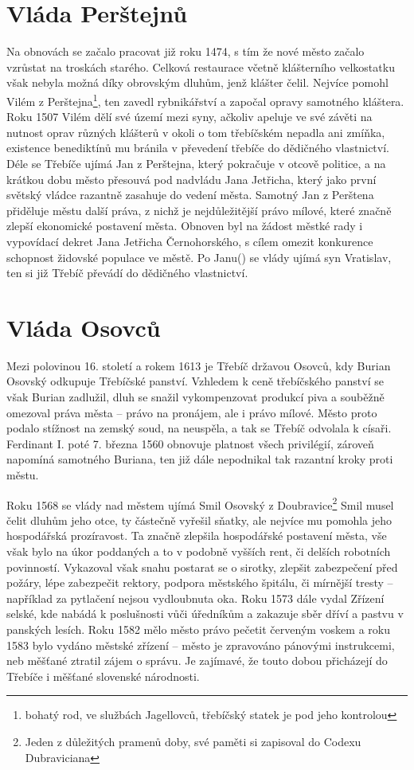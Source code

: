 \documentclass[a4paper,oneside,12p]{report}
\begin{document}
\section{Vláda Perštejnů}

Na obnovách se začalo pracovat již roku 1474, s tím že nové město začalo vzrůstat na troskách starého.
Celková restaurace včetně klášterního velkostatku však nebyla možná díky obrovským dluhům, jenž klášter čelil.
Nejvíce pomohl Vilém z Perštejna\footnote{bohatý rod, ve službách Jagellovců, třebíčský statek je pod jeho kontrolou}, ten zavedl rybnikářství a započal opravy samotného kláštera.
Roku 1507 Vilém dělí své území mezi syny, ačkoliv apeluje ve své závěti na nutnost oprav různých klášterů v okoli o tom třebíčském nepadla ani zmíňka, existence benediktínů mu bránila v převedení třebíče do dědičného vlastnictví.
Déle se Třebíče ujímá Jan z Perštejna, který pokračuje v otcově politice, a na krátkou dobu město přesouvá pod nadvládu Jana Jetřicha, který jako první světský vládce razantně zasahuje do vedení města.
Samotný Jan z Perštena přiděluje městu další práva, z nichž je nejdůležitější právo mílové, které značně zlepší ekonomické postavení města.
Obnoven byl na žádost městké rady i vypovídací dekret Jana Jetřicha Černohorského, s cílem omezit konkurence schopnost židovské populace ve městě.
Po Janu() se vlády ujímá syn Vratislav, ten si již Třebíč převádí do dědičného vlastnictví. %

\section{Vláda Osovců}
Mezi polovinou 16. století a rokem 1613 je Třebíč državou Osovců, kdy Burian Osovský odkupuje Třebíčské panství.
Vzhledem k ceně třebíčského panství se však Burian zadlužil, dluh se snažil vykompenzovat produkcí piva a souběžně omezoval práva města -- právo na pronájem, ale i právo mílové.
Město proto podalo stížnost na zemský soud, na neuspěla, a tak se Třebíč odvolala k císaři.
Ferdinant I. poté 7. března 1560 obnovuje platnost všech privilégií, zároveň napomíná samotného Buriana, ten již dále nepodnikal tak razantní kroky proti městu. %

Roku 1568 se vlády nad městem ujímá Smil Osovský z Doubravice\footnote{Jeden z důležitých pramenů doby, své paměti si zapisoval do Codexu Dubraviciana}
Smil musel čelit dluhům jeho otce, ty částečně vyřešil sňatky, ale nejvíce mu pomohla jeho hospodářská prozíravost.
Ta značně zlepšila hospodářské postavení města, vše však bylo na úkor poddaných a to v podobně vyšších rent, či delších robotních povinností.
Vykazoval však snahu postarat se o sirotky, zlepšit zabezpečení před požáry, lépe zabezpečit rektory, podpora městského špitálu, či mírnější tresty -- například za pytlačení nejsou vydloubnuta oka.
Roku 1573 dále vydal Zřízení selské, kde nabádá k poslušnosti vůči úředníkům a zakazuje sběr dříví a pastvu v panských lesích.
Roku 1582 mělo město právo pečetit červeným voskem a roku 1583 bylo vydáno městské zřízení -- město je zpravováno pánovými instrukcemi, neb měšťané ztratil zájem o správu. %
Je zajímavé, že touto dobou přicházejí do Třebíče i měšťané slovenské národnosti.
\end{document}
